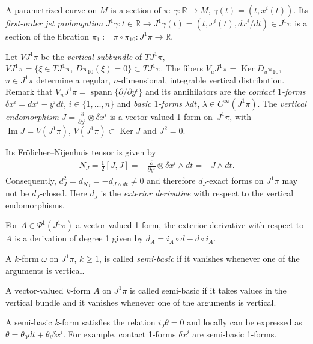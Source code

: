 A parametrized curve on $M$ is a section of $\pi$: $\gamma:\mathbb{R}\rightarrow M$,
$\gamma(t)=(t,x^{i}(t))$. Its \emph{first-order jet prolongation}
$J^{1}\gamma:t\in\mathbb{R}\rightarrow J^{1}\gamma(t)=\left(t,x^{i}(t),dx^{i}/dt\right)\in J^{1}\pi$
is a section of the f\/ibration $\pi_{1}:=\pi\circ\pi_{10}:  J^{1}\pi\rightarrow\mathbb{R}$.

Let $VJ^{1}\pi$ be the \emph{vertical subbundle} of $TJ^{1}\pi,$
$VJ^{1}\pi=\{\xi\in TJ^{1}\pi,\,  D\pi_{10}(\xi)=0\}\subset TJ^{1}\pi$.
The f\/ibers $V_{u}J^{1}\pi=\operatorname{Ker} D_{u}\pi_{10}$, $u\in J^{1}\pi$ determine
a regular, $n$-dimensional, integrable vertical distribution. Remark
that $V_{u}J^{1}\pi=\operatorname{spann}\{\partial/\partial y^{i}\}$
and its annihilators are the \emph{contact $1$-forms} $\delta x^{i}=dx^{i}-y^{i}dt$, $i\in \{1,\dots,n\}$
and \emph{basic $1$-forms} $\lambda dt$, $\lambda\in C^{\infty}(J^{1}\pi)$.
The \emph{vertical endomorphism} $J=\frac{\partial}{\partial y^{i}}\otimes\delta x^{i}$
is a vector-valued 1-form on~$J^{1}\pi$, with $\operatorname{Im}J=V(J^{1}\pi)$,
$V(J^{1}\pi)\subset\operatorname{Ker}J$ and $J^{2}=0$.

Its Fr\"olicher--Nijenhuis tensor is given by
\begin{gather*}
N_{J}=\frac{1}{2}[J,J]=-\frac{\partial}{\partial y^{i}}\otimes\delta x^{i}\wedge dt=-J\wedge dt.
\end{gather*}
 Consequently, $d_{J}^{2}=d_{N_{J}}=-d_{J\wedge dt}\neq0$ and therefore
$d_{J}$-exact forms on $J^{1}\pi$ may not be $d_{J}$-closed. Here
$d_{J}$ is the \emph{exterior derivative} with respect to the vertical
endomorphisms.

\begin{remark}
For $A\in\Psi^{1}(J^{1}\pi)$ a vector-valued 1-form, the exterior
derivative with respect to $A$ is a derivation of degree 1 given
by $d_{A}=i_{A}\circ d-d\circ i_{A}.$
\end{remark}
A $k$-form $\omega$ on $J^{1}\pi$, $k\geq1$, is called \emph{semi-basic}
if it vanishes whenever one of the arguments is vertical.

A vector-valued $k$-form $A$ on $J^{1}\pi$ is called semi-basic
if it takes values in the vertical bundle and it vanishes whenever
one of the arguments is vertical.

A semi-basic $k$-form satisf\/ies the relation $i_{J}\theta=0$ and
locally can be expressed as $\theta=\theta_{0}dt+\theta_{i}\delta x^{i}$.
For example, contact 1-forms $\delta x^{i}$ are semi-basic 1-forms.

